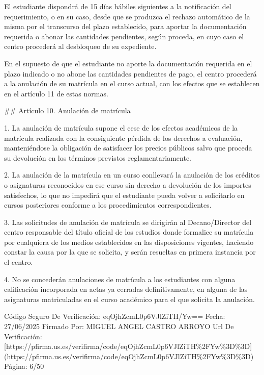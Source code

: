 \documentclass{article}
\begin{document}
\begin{itemize}
\begin{itemize}
\begin{scriptsize}
                  El estudiante dispondrá de 15 días hábiles siguientes a la notificación del requerimiento, o en su caso, desde que se produzca el rechazo automático de la misma por el transcurso del plazo establecido, para aportar la documentación requerida o abonar las cantidades pendientes, según proceda, en cuyo caso el centro procederá al desbloqueo de su expediente.

                  En el supuesto de que el estudiante no aporte la documentación requerida en el plazo indicado o no abone las cantidades pendientes de pago, el centro procederá a la anulación de su matrícula en el curso actual, con los efectos que se establecen en el artículo 11 de estas normas.

                  \#\# Artículo 10. Anulación de matrícula

                  1. La anulación de matrícula supone el cese de los efectos académicos de la matrícula realizada con la consiguiente pérdida de los derechos a evaluación, manteniéndose la obligación de satisfacer los precios públicos salvo que proceda su devolución en los términos previstos reglamentariamente.

                  2. La anulación de la matrícula en un curso conllevará la anulación de los créditos o asignaturas reconocidos en ese curso sin derecho a devolución de los importes satisfechos, lo que no impedirá que el estudiante pueda volver a solicitarlo en cursos posteriores conforme a los procedimientos correspondientes.

                  3. Las solicitudes de anulación de matrícula se dirigirán al Decano/Director del centro responsable del título oficial de los estudios donde formalice su matrícula por cualquiera de los medios establecidos en las disposiciones vigentes, haciendo constar la causa por la que se solicita, y serán resueltas en primera instancia por el centro.

                  4. No se concederán anulaciones de matrícula a los estudiantes con alguna calificación incorporada en actas ya cerradas definitivamente, en alguna de las asignaturas matriculadas en el curso académico para el que solicita la anulación.

                  Código Seguro De Verificación: eqOjhZcmL0p6VJlZiTH/Yw==
                  Fecha: 27/06/2025
                  Firmado Por: MIGUEL ANGEL CASTRO ARROYO
                  Url De Verificación: [https://pfirma.us.es/verifirma/code/eqOjhZcmL0p6VJlZiTH\%2FYw\%3D\%3D](https://pfirma.us.es/verifirma/code/eqOjhZcmL0p6VJlZiTH\%2FYw\%3D\%3D)
                  Página: 6/50


\end{scriptsize}
\end{itemize}
\end{itemize}
\end{document}
